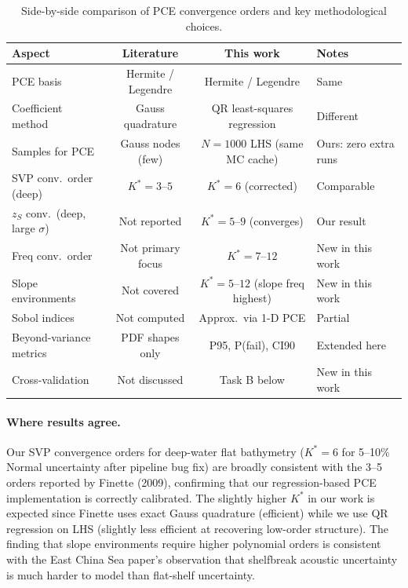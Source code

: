 \documentclass[11pt,a4paper]{article}
\begin{document}
\begin{table}[H]
  \centering
  \caption{Side-by-side comparison of PCE convergence orders and key methodological choices.}
  \label{tab:lit_comparison}
  \begin{tabular}{lccl}
    \toprule
    Aspect & Literature & This work & Notes \\
    \midrule
    PCE basis & Hermite / Legendre & Hermite / Legendre & Same \\
    Coefficient method & Gauss quadrature & QR least-squares regression & Different \\
    Samples for PCE & Gauss nodes (few) & $N=1000$ LHS (same MC cache) & Ours: zero extra runs \\
    SVP conv.\ order (deep) & $K^* = 3$--$5$ & $K^* = 6$ (corrected) & Comparable \\
    $z_S$ conv.\ (deep, large $\sigma$) & Not reported & $K^* = 5$--$9$ (converges) & Our result \\
    Freq conv.\ order & Not primary focus & $K^* = 7$--$12$ & New in this work \\
    Slope environments & Not covered & $K^* = 5$--$12$ (slope freq highest) & New in this work \\
    Sobol indices & Not computed & Approx.\ via 1-D PCE & Partial \\
    Beyond-variance metrics & PDF shapes only & P95, P(fail), CI90 & Extended here \\
    Cross-validation & Not discussed & Task B below & New in this work \\
    \bottomrule
  \end{tabular}
\end{table}

\paragraph{Where results agree.}
Our SVP convergence orders for deep-water flat bathymetry ($K^* = 6$ for 5--10\%
Normal uncertainty after pipeline bug fix) are broadly consistent with the 3--5 orders
reported by Finette (2009), confirming that our regression-based PCE implementation
is correctly calibrated.  The slightly higher $K^*$ in our work is expected since
Finette uses exact Gauss quadrature (efficient) while we use QR regression on LHS
(slightly less efficient at recovering low-order structure).
The finding that slope environments require higher polynomial orders is consistent with
the East China Sea paper's observation that shelfbreak acoustic uncertainty is much
harder to model than flat-shelf uncertainty.
\end{document}

